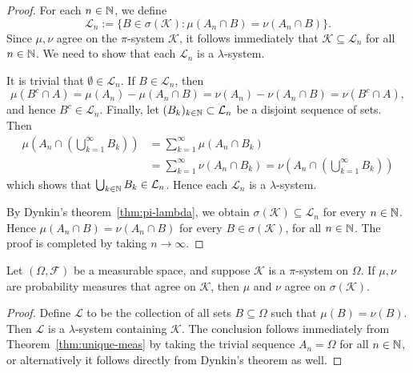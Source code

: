 \begin{proof}
    For each $n\in\mathbb{N}$, we define
    \begin{equation*}
        \mathcal{L}_n := \{ B\in\sigma(\mathcal{K}) : \mu(A_n\cap B)=\nu(A_n\cap B)\}.
    \end{equation*}
    Since $\mu,\nu$ agree on the $\pi$-system $\mathcal{K}$, it follows immediately that $\mathcal{K}\subseteq\mathcal{L}_n$ for all $n\in\mathbb{N}$. We need to show that each $\mathcal{L}_n$ is a $\lambda$-system.

    It is trivial that $\emptyset\in\mathcal{L}_n$. If $B\in\mathcal{L}_n$, then
    \begin{equation*}
        \mu(B^c\cap A) = \mu(A_n)-\mu(A_n\cap B) = \nu(A_n)-\nu(A_n\cap B) = \nu(B^c\cap A),
    \end{equation*}
    and hence $B^c\in\mathcal{L}_n$. Finally, let $(B_k)_{k\in\mathbb{N}}\subset\mathcal{L}_n$ be a disjoint sequence of sets. Then
    \begin{align*}
        \mu \left(A_n \cap (\bigcup_{k=1}^\infty B_k) \right) &= \sum_{k=1}^\infty \mu(A_n \cap B_k) \\
        &= \sum_{k=1}^\infty \nu(A_n \cap B_k) = \nu \left(A_n \cap (\bigcup_{k=1}^\infty B_k) \right)
    \end{align*}
    which shows that $\bigcup_{k\in\mathbb{N}}B_k\in\mathcal{L}_n$. Hence each $\mathcal{L}_n$ is a $\lambda$-system.

    By Dynkin's theorem~\eqref{thm:pi-lambda}, we obtain $\sigma(\mathcal{K})\subseteq\mathcal{L}_n$ for every $n\in\mathbb{N}$. Hence $\mu(A_n\cap B)=\nu(A_n\cap B)$ for every $B\in\sigma(\mathcal{K})$, for all $n\in\mathbb{N}$. The proof is completed by taking $n\to\infty$.
\end{proof}

\begin{corollary}
\label{cor:unique-meas}
Let $(\Omega,\mathcal{F})$ be a measurable space, and suppose $\mathcal{K}$ is a $\pi$-system on $\Omega$. If $\mu, \nu$ are probability measures that agree on $\mathcal{K}$, then $\mu$ and $\nu$ agree on $\sigma(\mathcal{K})$.
\end{corollary}

\begin{proof}
Define $\mathcal{L}$ to be the collection of all sets $B\subseteq\Omega$ such that $\mu(B) = \nu(B)$. Then $\mathcal{L}$ is a $\lambda$-system containing $\mathcal{K}$. The conclusion follows immediately from Theorem~\ref{thm:unique-meas} by taking the trivial sequence $A_n=\Omega$ for all $n\in\mathbb{N}$, or alternatively it follows directly from Dynkin's theorem as well.
\end{proof}


